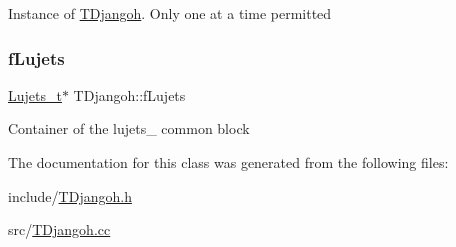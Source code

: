 Instance of \hyperlink{class_t_djangoh}{T\+Djangoh}. Only one at a time permitted \mbox{\label{class_t_djangoh_a844cd27abcd743028fb98b3fba0c0fa9}} 
\subsubsection{\texorpdfstring{f\+Lujets}{fLujets}}
{\footnotesize\ttfamily \hyperlink{struct_lujets__t}{Lujets\+\_\+t}$\ast$ T\+Djangoh\+::f\+Lujets\hspace{0.3cm}{\ttfamily [protected]}}

Container of the lujets\+\_\+ common block 

The documentation for this class was generated from the following files\+:\begin{DoxyCompactItemize}
\item 
include/\hyperlink{_t_djangoh_8h}{T\+Djangoh.\+h}\item 
src/\hyperlink{_t_djangoh_8cc}{T\+Djangoh.\+cc}\end{DoxyCompactItemize}
